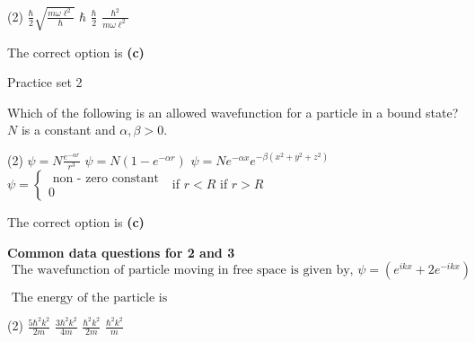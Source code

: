 \begin{enumerate}
\begin{minipage}{\textwidth}
\end{minipage}
\begin{tasks}(2)
	\task[\textbf{A.}] $\frac{\hbar}{2} \sqrt{\frac{m \omega \ell^{2}}{\hbar}}$
	\task[\textbf{B.}]$\hbar$
	\task[\textbf{C.}] $\frac{\hbar}{2}$
	\task[\textbf{D.}] $\frac{\hbar^{2}}{m \omega \ell^{2}}$
\end{tasks}
\begin{answer}
	The correct option is \textbf{(c)}
\end{answer}
\end{enumerate}
\newpage
\begin{abox}
	Practice set 2
\end{abox}
\begin{enumerate}
	\begin{minipage}{\textwidth}
		\item Which of the following is an allowed wavefunction for a particle in a bound state? $N$ is a constant and $\alpha, \beta>0$.
	\end{minipage}
	\begin{tasks}(2)
		\task[\textbf{A.}] $\psi=N \frac{e^{-\alpha r}}{r^{3}}$
		\task[\textbf{B.}]$\psi=N\left(1-e^{-\alpha r}\right)$
		\task[\textbf{C.}]$\psi=N e^{-\alpha x} e^{-\beta\left(x^{2}+y^{2}+z^{2}\right)}$
		\task[\textbf{D.}]$\psi=\left\{\begin{array}{l}\text { non - zero constant } \\ 0\end{array}\right.$
		if $r<R$ if $r>R$
	\end{tasks}
	\begin{answer}
		The correct option is \textbf{(c)}
	\end{answer}
	\textbf{Common data questions for 2 and 3}\\
	$\text { The wavefunction of particle moving in free space is given by, } \psi=\left(e^{i k x}+2 e^{-i k x}\right)$\\
	\begin{minipage}{\textwidth}
		\item $\text { The energy of the particle is }$
	\end{minipage}
	\begin{tasks}(2)
		\task[\textbf{A.}] $\frac{5 \hbar^{2} k^{2}}{2 m}$
		\task[\textbf{B.}]$\frac{3 \hbar^{2} k^{2}}{4 m}$
		\task[\textbf{C.}]$\frac{\hbar^{2} k^{2}}{2 m}$
		\task[\textbf{D.}]$\frac{\hbar^{2} k^{2}}{m}$
	\end{tasks}
	\begin{answer}

\end{answer}
\end{enumerate}
